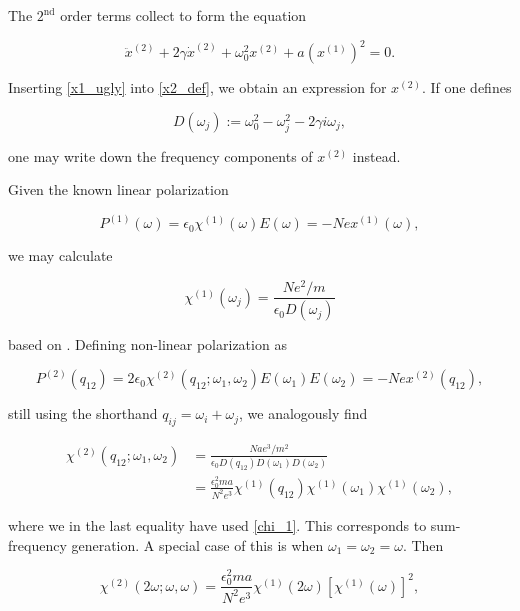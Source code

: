 \documentclass{article}
\begin{document}
The $2^{\text{nd}}$ order terms collect to form the equation

\begin{equation}
\label{x2_def}
\ddot{x}^{(2)} + 2\gamma\dot{x}^{(2)} + \omega_0^2x^{(2)} + a(x^{(1)})^2 = 0.
\end{equation}

Inserting \cref{x1_ugly} into \cref{x2_def}, we obtain an expression for $x^{(2)}$. If one defines

\begin{equation}
\label{D_def}
D(\omega_j) := \omega_0^2 - \omega_j^2 - 2\gamma i\omega_j,
\end{equation}

one may write down the frequency components of $x^{(2)}$ instead.

Given the known linear polarization

\begin{equation}
\label{lin_pol_def}
P^{(1)}(\omega) = \epsilon_0\chi^{(1)}(\omega)E(\omega) = -Nex^{(1)}(\omega),
\end{equation}

we may calculate

\begin{equation}
\label{chi_1}
\chi^{(1)}(\omega_j) = \frac{Ne^2/m}{\epsilon_0 D(\omega_j)}
\end{equation}

based on . Defining non-linear polarization as

\begin{equation}
P^{(2)}(q_{12}) = 2\epsilon_0\chi^{(2)}(q_{12}; \omega_1, \omega_2)E(\omega_1)E(\omega_2) = -Nex^{(2)}(q_{12}),
\end{equation}

still using the shorthand $q_{ij} = \omega_i + \omega_j$,  we analogously find

\begin{align}
\chi^{(2)}(q_{12}; \omega_1, \omega_2) & = \frac{Nae^3/m^2}{\epsilon_0 D(q_{12})D(\omega_1)D(\omega_2)} \\
& = \frac{\epsilon_0^2ma}{N^2e^3}\chi^{(1)}(q_{12})\chi^{(1)}(\omega_1)\chi^{(1)}(\omega_2),
\end{align}

where we in the last equality have used \cref{chi_1}. This corresponds to sum-frequency generation. A special case of this is when $\omega_1=\omega_2=\omega$. Then

\begin{equation}
\chi^{(2)}(2\omega;\omega,\omega) = \frac{\epsilon_0^2ma}{N^2e^3}\chi^{(1)}(2\omega)[\chi^{(1)}(\omega)]^2,
\end{equation}
\end{document}

